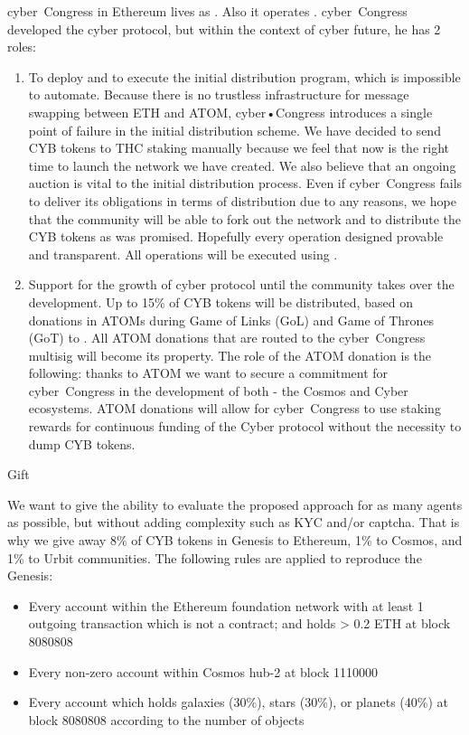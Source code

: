 \documentclass[8pt,oneside]{amsart}
\makeatletter
\newcommand{\linkgreen}[2]{\href{#1}{\color{green}{#2}}}
\renewcommand\subsection{\@startsection{subsection}
                                    {2}{\z@}
                                    {-3.25ex\@plus -1ex \@minus -.2ex}
                                    {0ex \@plus .2ex}
                                    {\play\Large}
                        }
\newcommand{\titleSection}[1]{\subsection{#1}}
\makeatother
\begin{document}
cyber~Congress in Ethereum lives as \linkgreen{https://mainnet.aragon.org/#/cybercongress/0x4feb2bcc5907e7779130c093eef8fb44502c1330/}{Aragon organization}. Also it operates \linkgreen{https://cyberd.ai/account/cyber1809vlaew5u5p24tvmse9kvgytwwr3ej7txe7p6}{2-of-3 multisig in Cyber network}. cyber~Congress developed the cyber protocol, but within the context of cyber future, he has 2 roles:
\begin{enumerate}
 \item To deploy and to execute the initial distribution program, which is impossible to automate. Because there is no trustless infrastructure for message swapping between ETH and ATOM, cyber•Congress introduces a single point of failure in the initial distribution scheme. We have decided to send CYB tokens to THC staking manually because we feel that now is the right time to launch the network we have created. We also believe that an ongoing auction is vital to the initial distribution process. Even if cyber~Congress fails to deliver its obligations in terms of distribution due to any reasons, we hope that the community will be able to fork out the network and to distribute the CYB tokens as was promised. Hopefully every operation designed provable and transparent. All operations will be executed using \linkgreen{https://cyberd.ai/account/cyber12v6jzx9vea277aqj0nffll8ewvme35w94yv258}{special purpose 2-of-3 multisig in Cyber network}.
 \item Support for the growth of cyber protocol until the community takes over the development. Up to 15\% of CYB tokens will be distributed, based on donations in ATOMs during Game of Links (GoL) and Game of Thrones (GoT) to \linkgreen{https://www.mintscan.io/account/cosmos1809vlaew5u5p24tvmse9kvgytwwr3ej7vd7kgq}{cyber~Congress Cosmos 2-of-3 multisig}. All ATOM donations that are routed to the cyber~Congress multisig will become its property. The role of the ATOM donation is the following: thanks to ATOM we want to secure a commitment for cyber~Congress in the development of both - the Cosmos  and Cyber ecosystems. ATOM donations will allow for cyber~Congress to use staking rewards for continuous funding of the Cyber protocol without the necessity to dump CYB tokens.
\end{enumerate}

\titleSection{Gift}\label{Gift}

We want to give the ability to evaluate the proposed approach for as many agents as possible, but without adding complexity such as KYC and/or captcha. That is why we give away 8\% of CYB tokens in Genesis to Ethereum, 1\% to Cosmos, and 1\% to Urbit communities. The following rules are applied to reproduce the Genesis:
\begin{itemize}
 \item Every account within the Ethereum foundation network with at least 1 outgoing transaction which is not a contract; and holds > 0.2 ETH at block 8080808
 \item Every non-zero account within Cosmos hub-2 at block 1110000
 \item Every account which holds galaxies (30\%), stars (30\%), or planets (40\%) at block 8080808 according to the number of objects
\end{itemize}
\end{document}
